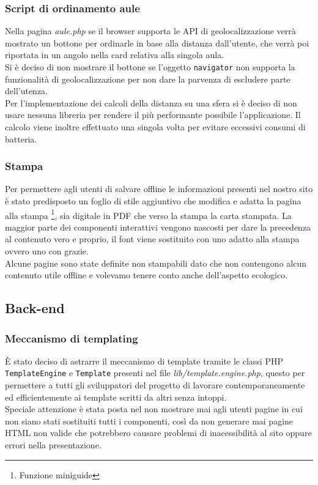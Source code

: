 \subsubsection{Script di ordinamento aule}
Nella pagina \textit{aule.php} se il browser supporta le API di geolocalizzazione verrà mostrato un bottone per ordinarle in base alla distanza dall'utente, che verrà poi riportata in un angolo nella card relativa alla singola aula.\\
Si è deciso di non mostrare il bottone se l'oggetto \texttt{navigator} non supporta la funzionalità di geolocalizzazione per non dare la parvenza di escludere parte dell'utenza.\\
Per l'implementazione dei calcoli della distanza su una sfera si è deciso di non usare nessuna libreria per rendere il più performante possibile l'applicazione. Il calcolo viene inoltre effettuato una singola volta per evitare eccessivi consumi di batteria.

\subsubsection{Stampa}
Per permettere agli utenti di salvare offline le informazioni presenti nel nostro sito è stato predisposto un foglio di stile aggiuntivo che modifica e adatta la pagina alla stampa \footnote{Funzione miniguide}, sia digitale in PDF che verso la stampa la carta stampata. La maggior parte dei componenti interattivi vengono nascosti per dare la precedenza al contenuto vero e proprio, il font viene sostituito con uno adatto alla stampa ovvero uno con grazie.\\
Alcune pagine sono state definite non stampabili dato che non contengono alcun contenuto utile offline e volevamo tenere conto anche dell'aspetto ecologico.

\subsection{Back-end}

\subsubsection{Meccanismo di templating}
È stato deciso di astrarre il meccanismo di template tramite le classi PHP \texttt{TemplateEngine} e \texttt{Template} presenti nel file \textit{lib/template.engine.php}, questo per permettere a tutti gli sviluppatori del progetto di lavorare contemporaneamente ed efficientemente ai template scritti da altri senza intoppi.\\
Speciale attenzione è stata posta nel non mostrare mai agli utenti pagine in cui non siano stati sostituiti tutti i componenti, così da non generare mai pagine HTML non valide che potrebbero causare problemi di inacessibilità al sito oppure errori nella presentazione.

